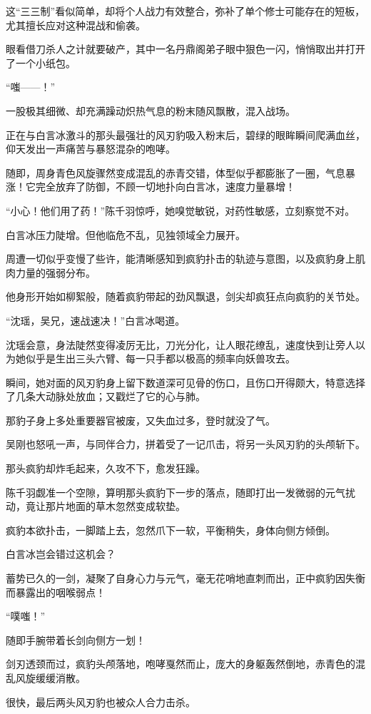 这“三三制”看似简单，却将个人战力有效整合，弥补了单个修士可能存在的短板，尤其擅长应对这种混战和偷袭。

眼看借刀杀人之计就要破产，其中一名丹鼎阁弟子眼中狠色一闪，悄悄取出并打开了一个小纸包。

“嗤——！”

一股极其细微、却充满躁动炽热气息的粉末随风飘散，混入战场。

正在与白言冰激斗的那头最强壮的风刃豹吸入粉末后，碧绿的眼眸瞬间爬满血丝，仰天发出一声痛苦与暴怒混杂的咆哮。

随即，周身青色风旋骤然变成混乱的赤青交错，体型似乎都膨胀了一圈，气息暴涨！它完全放弃了防御，不顾一切地扑向白言冰，速度力量暴增！

“小心！他们用了药！”陈千羽惊呼，她嗅觉敏锐，对药性敏感，立刻察觉不对。

白言冰压力陡增。但他临危不乱，见独领域全力展开。

周遭一切似乎变慢了些许，能清晰感知到疯豹扑击的轨迹与意图，以及疯豹身上肌肉力量的强弱分布。

他身形开始如柳絮般，随着疯豹带起的劲风飘退，剑尖却疯狂点向疯豹的关节处。

“沈瑶，吴兄，速战速决！”白言冰喝道。

沈瑶会意，身法陡然变得凌厉无比，刀光分化，让人眼花缭乱，速度快到让旁人以为她似乎是生出三头六臂、每一只手都以极高的频率向妖兽攻去。

瞬间，她对面的风刃豹身上留下数道深可见骨的伤口，且伤口开得颇大，特意选择了几条大动脉处放血；又戳烂了它的心与肺。

那豹子身上多处重要器官被废，又失血过多，登时就没了气。

吴刚也怒吼一声，与同伴合力，拼着受了一记爪击，将另一头风刃豹的头颅斩下。

那头疯豹却炸毛起来，久攻不下，愈发狂躁。

陈千羽觑准一个空隙，算明那头疯豹下一步的落点，随即打出一发微弱的元气扰动，竟让那片地面的草木忽然变成软垫。

疯豹本欲扑击，一脚踏上去，忽然爪下一软，平衡稍失，身体向侧方倾倒。

白言冰岂会错过这机会？

蓄势已久的一剑，凝聚了自身心力与元气，毫无花哨地直刺而出，正中疯豹因失衡而暴露出的咽喉弱点！

“噗嗤！”

随即手腕带着长剑向侧方一划！

剑刃透颈而过，疯豹头颅落地，咆哮戛然而止，庞大的身躯轰然倒地，赤青色的混乱风旋缓缓消散。

很快，最后两头风刃豹也被众人合力击杀。

